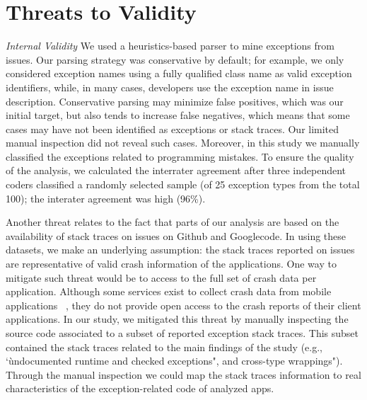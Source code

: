 \documentclass[conference]{IEEEtran}
\begin{document}



\section{Threats to Validity}
\label{sec:threats}

\noindent\emph{Internal Validity} We used a heuristics-based parser to mine
exceptions from issues.  Our parsing strategy was conservative by default; for
example, we only considered exception names using a fully qualified class name
as valid exception identifiers, while, in many cases, developers use the
exception name in issue description. Conservative parsing may minimize false
positives, which was our initial target, but also tends to increase false
negatives, which means that some cases may have not been identified as
exceptions or stack traces. Our limited manual inspection did not reveal such
cases. Moreover, in this study we manually classified the exceptions 
related to programming mistakes. To ensure the quality of the analysis, 
we calculated the interrater agreement after three independent 
coders classified a randomly selected sample (of 25 exception 
types from the total 100); the interater agreement was high (96\%). 

Another threat relates to the fact that parts of our analysis 
are based on the availability of stack traces on issues on Github and Googlecode. 
In using these datasets, we make an underlying assumption: the stack traces reported on issues are 
representative of valid crash information of the applications. 
One way to mitigate such threat would be to access to the full 
set of crash data per application. Although some services exist 
to collect crash data from mobile applications ~\cite{BugSe14,BugSn14,Googl14,Acra14},
they do not provide open access to the crash reports of their client applications.
In our study, we mitigated this threat by manually inspecting
the source code associated to a subset of reported exception stack traces.
This subset contained the stack traces related to the main findings 
of the study (e.g., `ùndocumented runtime and checked exceptions",
and cross-type wrappings"). Through the manual inspection
 we could map the stack traces information to real characteristics 
of the exception-related code of analyzed apps.
\end{document}
